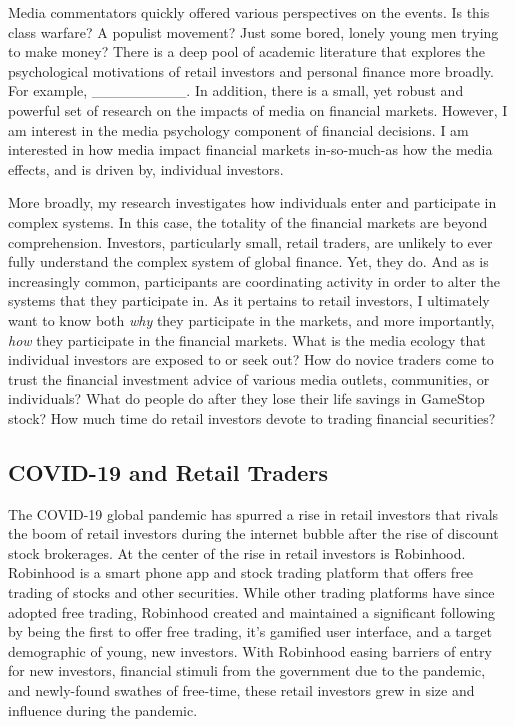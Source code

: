 \documentclass[12pt,]{article}
\begin{document}
Media commentators quickly offered various perspectives on the events.
Is this class warfare? A populist movement? Just some bored, lonely
young men trying to make money? There is a deep pool of academic
literature that explores the psychological motivations of retail
investors and personal finance more broadly. For example,
\_\_\_\_\_\_\_\_\_. In addition, there is a small, yet robust and
powerful set of research on the impacts of media on financial markets.
However, I am interest in the media psychology component of financial
decisions. I am interested in how media impact financial markets
in-so-much-as how the media effects, and is driven by, individual
investors.

More broadly, my research investigates how individuals enter and
participate in complex systems. In this case, the totality of the
financial markets are beyond comprehension. Investors, particularly
small, retail traders, are unlikely to ever fully understand the complex
system of global finance. Yet, they do. And as is increasingly common,
participants are coordinating activity in order to alter the systems
that they participate in. As it pertains to retail investors, I
ultimately want to know both \emph{why} they participate in the markets,
and more importantly, \emph{how} they participate in the financial
markets. What is the media ecology that individual investors are exposed
to or seek out? How do novice traders come to trust the financial
investment advice of various media outlets, communities, or individuals?
What do people do after they lose their life savings in GameStop stock?
How much time do retail investors devote to trading financial
securities?

\hypertarget{covid-19-and-retail-traders}{%
\subsection{COVID-19 and Retail
Traders}\label{covid-19-and-retail-traders}}

The COVID-19 global pandemic has spurred a rise in retail investors that
rivals the boom of retail investors during the internet bubble after the
rise of discount stock brokerages. At the center of the rise in retail
investors is Robinhood. Robinhood is a smart phone app and stock trading
platform that offers free trading of stocks and other securities. While
other trading platforms have since adopted free trading, Robinhood
created and maintained a significant following by being the first to
offer free trading, it's gamified user interface, and a target
demographic of young, new investors. With Robinhood easing barriers of
entry for new investors, financial stimuli from the government due to
the pandemic, and newly-found swathes of free-time, these retail
investors grew in size and influence during the pandemic.
\end{document}
